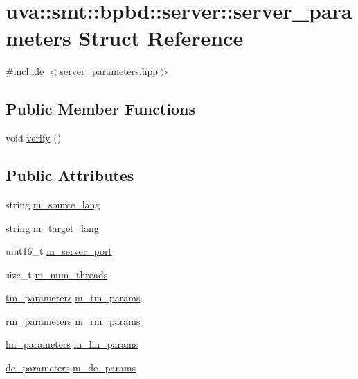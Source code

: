 \hypertarget{structuva_1_1smt_1_1bpbd_1_1server_1_1server__parameters}{}\section{uva\+:\+:smt\+:\+:bpbd\+:\+:server\+:\+:server\+\_\+parameters Struct Reference}
\label{structuva_1_1smt_1_1bpbd_1_1server_1_1server__parameters}


{\ttfamily \#include $<$server\+\_\+parameters.\+hpp$>$}

\subsection*{Public Member Functions}
\begin{DoxyCompactItemize}
\item 
void \hyperlink{structuva_1_1smt_1_1bpbd_1_1server_1_1server__parameters_a1427cb944fc690f0ab144c71e255984a}{verify} ()
\end{DoxyCompactItemize}
\subsection*{Public Attributes}
\begin{DoxyCompactItemize}
\item 
string \hyperlink{structuva_1_1smt_1_1bpbd_1_1server_1_1server__parameters_ac516b94082ea54b54477a5ed52e6dcfa}{m\+\_\+source\+\_\+lang}
\item 
string \hyperlink{structuva_1_1smt_1_1bpbd_1_1server_1_1server__parameters_a4db4133ba3f0564deae864d1598b2019}{m\+\_\+target\+\_\+lang}
\item 
uint16\+\_\+t \hyperlink{structuva_1_1smt_1_1bpbd_1_1server_1_1server__parameters_a0a5f681cdd40ad5962206174c692bce0}{m\+\_\+server\+\_\+port}
\item 
size\+\_\+t \hyperlink{structuva_1_1smt_1_1bpbd_1_1server_1_1server__parameters_a820bb1be7c6ad4b8b3f618bec32d1e27}{m\+\_\+num\+\_\+threads}
\item 
\hyperlink{structuva_1_1smt_1_1bpbd_1_1server_1_1tm_1_1tm__parameters}{tm\+\_\+parameters} \hyperlink{structuva_1_1smt_1_1bpbd_1_1server_1_1server__parameters_ac6d1ed3b9b3127ed1bc03adf3ea2b882}{m\+\_\+tm\+\_\+params}
\item 
\hyperlink{structuva_1_1smt_1_1bpbd_1_1server_1_1rm_1_1rm__parameters}{rm\+\_\+parameters} \hyperlink{structuva_1_1smt_1_1bpbd_1_1server_1_1server__parameters_a44c85db327e8e94de77ed7de2dcc9765}{m\+\_\+rm\+\_\+params}
\item 
\hyperlink{structuva_1_1smt_1_1bpbd_1_1server_1_1lm_1_1lm__parameters}{lm\+\_\+parameters} \hyperlink{structuva_1_1smt_1_1bpbd_1_1server_1_1server__parameters_a572abdaf3ed224f54264606d7a15e872}{m\+\_\+lm\+\_\+params}
\item 
\hyperlink{namespaceuva_1_1smt_1_1bpbd_1_1server_1_1decoder_aaf4d5faf3a48156401c854d163d4b848}{de\+\_\+parameters} \hyperlink{structuva_1_1smt_1_1bpbd_1_1server_1_1server__parameters_a5887909b61e798b9cf7020b19ee0b6cf}{m\+\_\+de\+\_\+params}
\end{DoxyCompactItemize}


